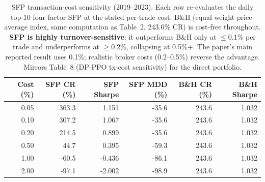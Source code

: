\begin{table}[htbp]
\centering
\caption{SFP transaction-cost sensitivity (2019--2023). Each row re-evaluates the daily top-10 four-factor SFP at the stated per-trade cost. B\&H (equal-weight price-average index, same computation as Table~2, 243.6\% CR) is cost-free throughout. \textbf{SFP is highly turnover-sensitive}: it outperforms B\&H only at $\leq$0.1\% per trade and underperforms at $\geq$0.2\%, collapsing at 0.5\%+. The paper's main reported result uses 0.1\%; realistic broker costs (0.2--0.5\%) reverse the advantage. Mirrors Table~8 (DP-PPO tx-cost sensitivity) for the direct portfolio.}
\label{tab:sfp_txcost}
\begin{tabular}{rrrrrr}
\toprule
\textbf{Cost (\%)} & \textbf{SFP CR (\%)} & \textbf{SFP Sharpe} & \textbf{SFP MDD (\%)} & \textbf{B\&H CR (\%)} & \textbf{B\&H Sharpe} \\
\midrule
0.05 & 363.3 & 1.151 & -35.6 & 243.6 & 1.032 \\
0.10 & 307.2 & 1.067 & -35.6 & 243.6 & 1.032 \\
0.20 & 214.5 & 0.899 & -35.6 & 243.6 & 1.032 \\
0.50 & 44.7 & 0.395 & -59.3 & 243.6 & 1.032 \\
1.00 & -60.5 & -0.436 & -86.1 & 243.6 & 1.032 \\
2.00 & -97.1 & -2.002 & -98.9 & 243.6 & 1.032 \\
\bottomrule
\end{tabular}
\end{table}
